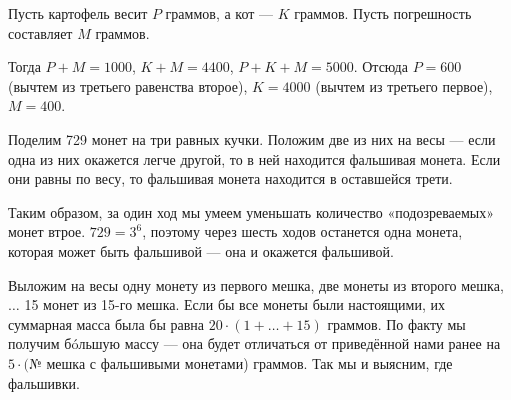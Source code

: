 
\begin{enumerate}
\itA Пусть картофель весит $P$ граммов, а кот — $K$ граммов. Пусть погрешность составляет $M$ граммов.

Тогда $P+M=1000$, $K+M=4400$, $P+K+M=5000$. Отсюда $P=600$ (вычтем из третьего равенства второе), $K=4000$ (вычтем из третьего первое), $M=400$.

\itB Поделим 729 монет на три равных кучки. Положим две из них на весы — если одна из них окажется легче другой, то в ней находится фальшивая монета. Если они равны по весу, то фальшивая монета находится в оставшейся трети.

Таким образом, за один ход мы умеем уменьшать количество «подозреваемых» монет втрое. $729 = 3^6$, поэтому через шесть ходов останется одна монета, которая может быть фальшивой — она и окажется фальшивой.

\itC Выложим на весы одну монету из первого мешка, две монеты из второго мешка,~$\ldots$ 15 монет из 15-го мешка. Если бы все монеты были настоящими, их суммарная масса была бы равна $20 \cdot (1+ \ldots + 15)$ граммов. По факту мы получим б\'oльшую массу — она будет отличаться от приведённой нами ранее на $5\cdot($№ мешка с фальшивыми монетами) граммов. Так мы и выясним, где фальшивки.
\end{enumerate}